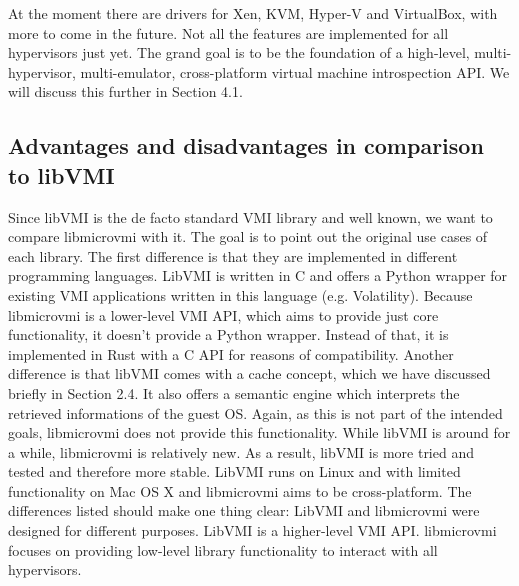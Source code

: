 \documentclass[sigconf]{acmart}
\begin{document}
\newline
At the moment there are drivers for Xen, KVM, Hyper-V and VirtualBox, with more to come in the future. Not all the features are implemented for all hypervisors just yet. The grand goal is to be the foundation of a high-level, multi-hypervisor, multi-emulator, cross-platform virtual machine introspection API. We will discuss this further in Section 4.1. 

\subsection{Advantages and disadvantages in comparison to libVMI }
Since libVMI is the de facto standard VMI library and well known, we want to compare libmicrovmi with it. The goal is to point out the original use cases of each library. 
\newline
\newline
The first difference is that they are implemented in different programming languages. LibVMI is written in C and offers a Python wrapper for existing VMI applications written in this language (e.g. Volatility). Because libmicrovmi is a lower-level VMI API, which aims to provide just core functionality, it doesn't provide a Python wrapper. Instead of that, it is implemented in Rust with a C API for reasons of compatibility. 
\newline
\newline
Another difference is that libVMI comes with a cache concept, which we have discussed briefly in Section 2.4. It also offers a semantic engine which interprets the retrieved informations of the guest OS. Again, as this is not part of the intended goals, libmicrovmi does not provide this functionality.
\newline
\newline
While libVMI is around for a while, libmicrovmi is relatively new. As a result, libVMI is more tried and tested and therefore more stable. 
\newline
\newline
LibVMI runs on Linux and with limited functionality on Mac OS X and libmicrovmi aims to be cross-platform.  
\newline
\newline
The differences listed should make one thing clear: LibVMI and libmicrovmi were designed for different purposes. LibVMI is a higher-level VMI API. libmicrovmi focuses on providing low-level library functionality to interact with all hypervisors.
\end{document}
